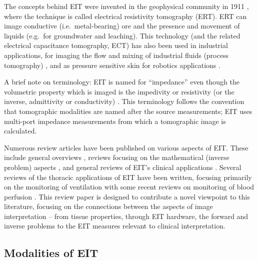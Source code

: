 \documentclass[10pt,journal]{IEEEtran}\def\TBLWIDA{15mm}\def\TBLWIDB{60mm}
\begin{document}
The concepts behind EIT were invented in the 
geophysical community in 1911 \cite{Allaud1977}, where
the technique is called electrical resistivity
tomography (ERT). ERT can
image conductive (i.e.\ metal-bearing) ore
and the presence and movement of liquids
(e.g.\ for groundwater and leaching).
This technology (and the related electrical capacitance
tomography, ECT) has also been used in industrial
applications, 
 for imaging the flow and mixing of industrial fluids
(process tomography) \cite{Beck1996Process},
and as pressure sensitive skin for robotics applications
\cite{Silvera2015Skin}.

A brief note on terminology: EIT is named for
``impedance'' even though the volumetric property which is
imaged is the impedivity or resistivity (or the inverse,
              admittivity or conductivity) \cite{Bayford2006Bioimpendace}.
This terminology follows the convention that 
tomographic modalities are named after the source measurements;
EIT uses multi-port impedance measurements
from which a tomographic image is calculated.

Numerous review articles have been published on various
aspects of EIT. These include general overviews
\cite{Brown2003EIT, Holder2004Book, Cheney1999EIT},
reviews focusing on the mathematical (inverse problem) aspects
\cite{Adler2016Handbook, Borcea2002EIT, Uhlmann2009EIT}, 
and general reviews of EIT's clinical applications
\cite{Dijkstra1993EIT}.
Several reviews of the thoracic applications of EIT have
been written, focusing primarily on the monitoring of
ventilation
\cite{Adler2012Whither,
      Bodenstein2009EIT,
      Costa2009EIT,
      Frerichs2017Chest,
      Frerichs2014EIT,
      Frerichs2000EIT,
      Lundin2012EIT,
      Riedel2010EIT} 
with some recent reviews on 
monitoring of blood perfusion
\cite{Leonhardt2012EIT, Nguyen2012Perfusion}.
This review paper is designed to contribute a novel viewpoint
to this literature, focusing on the connections between 
the aspects of image interpretation -- from tissue
properties, through EIT hardware, the forward and inverse problems
to the EIT measures relevant to clinical interpretation.

\subsection{Modalities of EIT}
\end{document}
